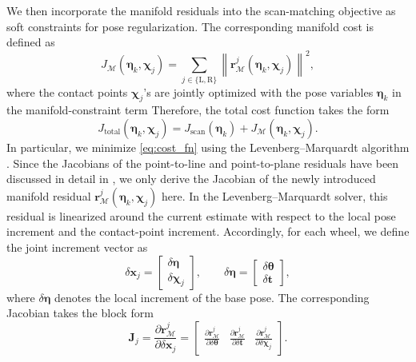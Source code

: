 \documentclass[journal,twoside,web]{ieeecolor}
\begin{document}
We then incorporate the manifold residuals into the scan-matching objective as soft constraints for pose regularization. The corresponding manifold cost is defined as
\begin{equation}\label{eq:J_M_new}
    J_{\mathcal{M}}(\bm\eta_k,\bm\chi_j)
    =
    \sum_{j\in\{\mathrm{L},\mathrm{R}\}}
    \left\|
    \mathbf{r}_{\mathcal{M}}^j(\bm\eta_k,\bm\chi_j)
    \right\|^2,
\end{equation}
where the contact points $\bm\chi_j$'s are jointly optimized with the pose variables $\bm\eta_k$ in the manifold-constraint term
Therefore, the total cost function takes the form
\begin{equation}\label{eq:cost_fn}
    J_{\mathrm{total}}(\bm\eta_k,\bm\chi_j)
    =
    J_{\mathrm{scan}}(\bm\eta_k)
    +
    J_{\mathcal{M}}(\bm\eta_k,\bm\chi_j).
\end{equation}
In particular, we minimize \eqref{eq:cost_fn} using the Levenberg--Marquardt algorithm \cite{LM_algo}. Since the Jacobians of the point-to-line and point-to-plane residuals have been discussed in detail in \cite{liosam}, we only derive the Jacobian of the newly introduced manifold residual \(\mathbf{r}_{\mathcal{M}}^j(\bm{\eta}_k,\bm{\chi}_j)\) here. In the Levenberg--Marquardt solver, this residual is linearized around the current estimate with respect to the local pose increment and the contact-point increment. Accordingly, for each wheel, we define the joint increment vector as
\[
\delta \mathbf{x}_j
=
\begin{bmatrix}
\delta \boldsymbol{\eta}\\
\delta \bm{\chi}_j
\end{bmatrix},
\qquad
\delta \boldsymbol{\eta}
=
\begin{bmatrix}
\delta \boldsymbol{\theta}\\
\delta \mathbf{t}
\end{bmatrix},
\]
where \(\delta \boldsymbol{\eta}\) denotes the local increment of the base pose. The corresponding Jacobian takes the block form
\begin{equation}\label{J_i}
\mathbf{J}_j
=
\frac{\partial \mathbf{r}_{\mathcal{M}}^j}{\partial \delta \mathbf{x}_j}
=
\begin{bmatrix}
\frac{\partial \mathbf{r}_{\mathcal{M}}^j}{\partial \delta \boldsymbol{\theta}} &
\frac{\partial \mathbf{r}_{\mathcal{M}}^j}{\partial \delta \mathbf{t}} &
\frac{\partial \mathbf{r}_{\mathcal{M}}^j}{\partial \delta \bm{\chi}_j}
\end{bmatrix}.
\end{equation}
\end{document}
